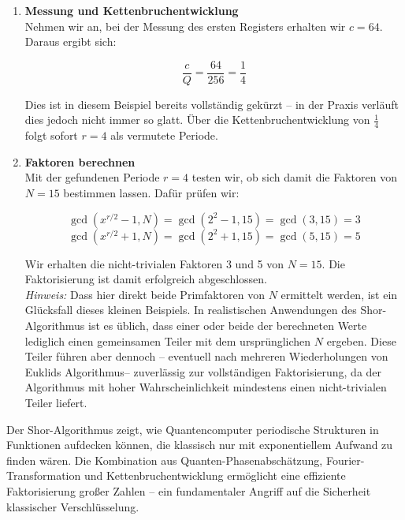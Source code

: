 \begin{enumerate}
    \item \textbf{Messung und Kettenbruchentwicklung} \\

    Nehmen wir an, bei der Messung des ersten Registers erhalten wir \( c = 64 \). Daraus ergibt sich:

    \[
    \frac{c}{Q} = \frac{64}{256} = \frac{1}{4}
    \]

    Dies ist in diesem Beispiel bereits vollständig gekürzt – in der Praxis verläuft dies jedoch nicht immer so glatt. Über die Kettenbruchentwicklung von \( \frac{1}{4} \) folgt sofort \( r = 4 \) als vermutete Periode.\\

    \item \textbf{Faktoren berechnen} \\

    Mit der gefundenen Periode \( r = 4 \) testen wir, ob sich damit die Faktoren von \( N = 15 \) bestimmen lassen. Dafür prüfen wir:

\[
\gcd(x^{r/2} - 1, N) = \gcd(2^2 - 1, 15) = \gcd(3, 15) = 3
\]
\[
\gcd(x^{r/2} + 1, N) = \gcd(2^2 + 1, 15) = \gcd(5, 15) = 5
\]

    Wir erhalten die nicht-trivialen Faktoren 3 und 5 von \( N = 15 \). Die Faktorisierung ist damit erfolgreich abgeschlossen.\\

\textit{Hinweis:} Dass hier direkt beide Primfaktoren von \( N \) ermittelt werden, ist ein Glücksfall dieses kleinen Beispiels. In realistischen Anwendungen des Shor-Algorithmus ist es üblich, dass einer oder beide der berechneten Werte lediglich einen gemeinsamen Teiler mit dem ursprünglichen \( N \) ergeben. Diese Teiler führen aber dennoch – eventuell nach mehreren Wiederholungen von Euklids Algorithmus– zuverlässig zur vollständigen Faktorisierung, da der Algorithmus mit hoher Wahrscheinlichkeit mindestens einen nicht-trivialen Teiler liefert.

\end{enumerate}

Der Shor-Algorithmus zeigt, wie Quantencomputer periodische Strukturen in Funktionen aufdecken können, die klassisch nur mit exponentiellem Aufwand zu finden wären. Die Kombination aus Quanten-Phasenabschätzung, Fourier-Transformation und Kettenbruchentwicklung ermöglicht eine effiziente Faktorisierung großer Zahlen – ein fundamentaler Angriff auf die Sicherheit klassischer Verschlüsselung.\\

